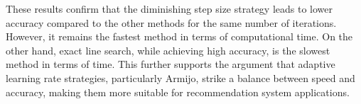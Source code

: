 \documentclass[a4paper, 11pt, reqno]{article} %
\begin{document}
\begin{multicols}{2}
These results confirm that the diminishing step size strategy leads to lower accuracy compared to the other methods for the same number of iterations. However, it remains the fastest method in terms of computational time. On the other hand, exact line search, while achieving high accuracy, is the slowest method in terms of time. This further supports the argument that adaptive learning rate strategies, particularly Armijo, strike a balance between speed and accuracy, making them more suitable for recommendation system applications.



 
\medskip

\printbibliography %

\end{multicols}%
\end{document}
